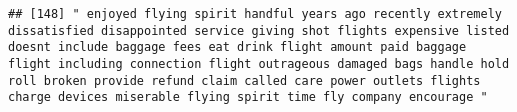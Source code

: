 \documentclass[
]{article}
\begin{document}
\begin{verbatim}
## [148] " enjoyed flying spirit handful years ago recently extremely dissatisfied disappointed service giving shot flights expensive listed doesnt include baggage fees eat drink flight amount paid baggage flight including connection flight outrageous damaged bags handle hold roll broken provide refund claim called care power outlets flights charge devices miserable flying spirit time fly company encourage "                                                                                                                                                                                                                                                                                                                                                                                                                                                                                                                                                                                                                                                                                                                                                                                                                                                                                                                                                                                                                                                                                                                                                                                                                                                                                                                                                                              

\end{verbatim}
\end{document}
